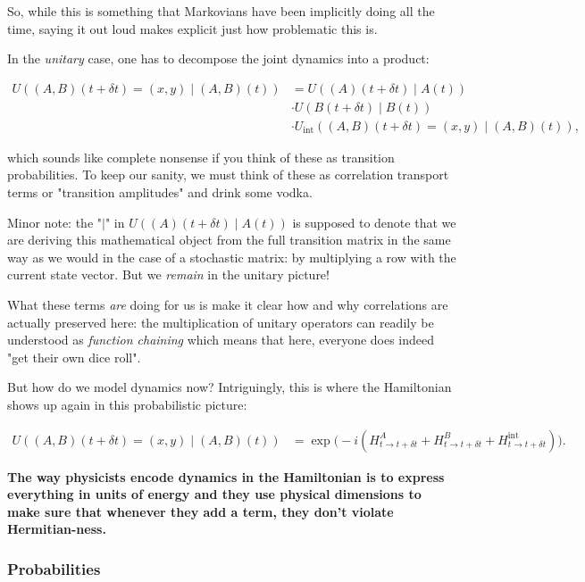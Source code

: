 \documentclass{article}
\begin{document}
So, while this is something that Markovians have been implicitly doing all the time, saying it out loud makes explicit just how problematic this is.

In the \textit{unitary} case, one has to decompose the joint dynamics into a product:

\begin{align*}
 U((A,B)(t+\delta t) = (x,y)\mid (A,B)(t)) &= U((A)(t + \delta t)\mid A(t))\\ & \cdot U(B(t+\delta t) \mid B(t)) \\ & \cdot U_{\operatorname{int}}((A,B)(t+\delta t) = (x,y)\mid (A,B)(t)),
 \end{align*}

which sounds like complete nonsense if you think of these as transition probabilities. To keep our sanity, we must think of these as correlation transport terms or "transition amplitudes" and drink some vodka.


Minor note: the "$\mid$" in $U((A)(t + \delta t)\mid A(t))$ is supposed to denote that we are deriving this mathematical object from the full transition matrix in the same way as we would in the case of a stochastic matrix: by multiplying a row with the current state vector. But we \textit{remain} in the unitary picture!

What these terms \textit{are} doing for us is make it clear how and why correlations are actually preserved here: the multiplication of unitary operators can readily be understood as \textit{function chaining} which means that here, everyone does indeed "get their own dice roll".

But how do we model dynamics now? Intriguingly, this is where the Hamiltonian shows up again in this probabilistic picture:

\begin{align*}
 U((A,B)(t+\delta t) = (x,y)\mid (A,B)(t)) &= \operatorname{exp}\big (-i( H^A_{t \to t+\delta t} + H^B_{t \to t+\delta t} + H^{\operatorname{int}}_{t \to t+\delta t}) \big ).
\end{align*}

\textbf{The way physicists encode dynamics in the Hamiltonian is to express everything in units of energy and they use physical dimensions to make sure that whenever they add a term, they don't violate Hermitian-ness.}

\subsubsection{Probabilities}
\end{document}
